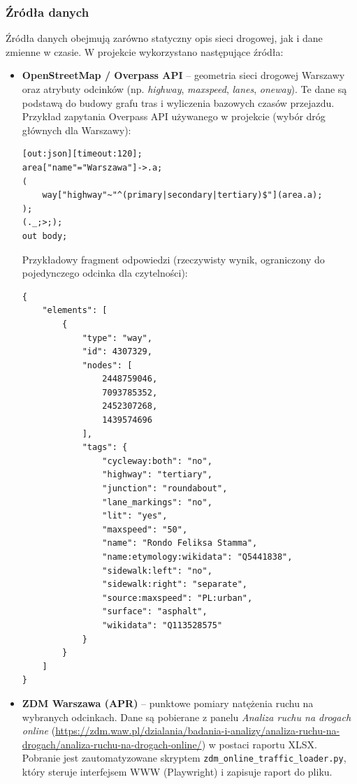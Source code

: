 \documentclass[12pt]{article}
\begin{document}
\subsubsection{Źródła danych}
Źródła danych obejmują zarówno statyczny opis sieci drogowej, jak i dane zmienne w czasie.
W projekcie wykorzystano następujące źródła:
\begin{itemize}
    \item \textbf{OpenStreetMap / Overpass API} -- geometria sieci drogowej Warszawy oraz atrybuty
    odcinków (np. \textit{highway}, \textit{maxspeed}, \textit{lanes}, \textit{oneway}). Te dane są
    podstawą do budowy grafu tras i wyliczenia bazowych czasów przejazdu.
    Przykład zapytania Overpass API używanego w projekcie (wybór dróg głównych dla Warszawy):
\begin{tcolorbox}
\begin{verbatim}
[out:json][timeout:120];
area["name"="Warszawa"]->.a;
(
    way["highway"~"^(primary|secondary|tertiary)$"](area.a);
);
(._;>;);
out body;
\end{verbatim}
\end{tcolorbox}

Przykładowy fragment odpowiedzi (rzeczywisty wynik, ograniczony do pojedynczego odcinka dla czytelności):
\begin{tcolorbox}
\begin{verbatim}
{
    "elements": [
        {
            "type": "way",
            "id": 4307329,
            "nodes": [
                2448759046,
                7093785352,
                2452307268,
                1439574696
            ],
            "tags": {
                "cycleway:both": "no",
                "highway": "tertiary",
                "junction": "roundabout",
                "lane_markings": "no",
                "lit": "yes",
                "maxspeed": "50",
                "name": "Rondo Feliksa Stamma",
                "name:etymology:wikidata": "Q5441838",
                "sidewalk:left": "no",
                "sidewalk:right": "separate",
                "source:maxspeed": "PL:urban",
                "surface": "asphalt",
                "wikidata": "Q113528575"
            }
        }
    ]
}
\end{verbatim}
\end{tcolorbox}

    \item \textbf{ZDM Warszawa (APR)} -- punktowe pomiary natężenia ruchu na wybranych odcinkach.
    Dane są pobierane z panelu \textit{Analiza ruchu na drogach online}
   {\sloppy (\url{https://zdm.waw.pl/dzialania/badania-i-analizy/analiza-ruchu-na-drogach/analiza-ruchu-na-drogach-online/})\fussy}
    w postaci raportu XLSX.
    Pobranie jest zautomatyzowane skryptem \verb|zdm_online_traffic_loader.py|,
    który steruje interfejsem WWW (Playwright) i zapisuje raport do pliku.
    

\end{itemize}
\end{document}
